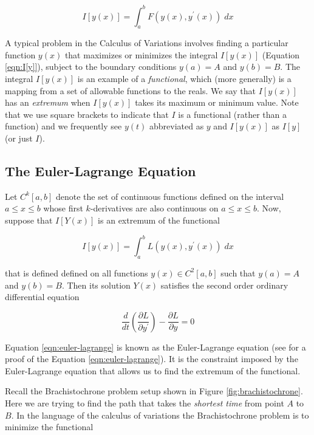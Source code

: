 \documentclass{article}
\theoremstyle{definition}
\begin{document}
\begin{equation}
I[y(x)] = \int_a^b F(y(x), y^{\prime}(x)) \; dx
\label{eqn:I[y]}
\end{equation}

\bigskip
\noindent
A typical problem in the Calculus of Variations involves finding
a particular function $y(x)$ that maximizes or minimizes the
integral $I[y(x)]$ (Equation \ref{eqn:I[y]}), subject to the
boundary conditions $y(a) = A$ and $y(b) = B$. The integral
$I[y(x)]$ is an example of a \emph{functional}, which (more
generally) is a mapping from a set of allowable functions to the
reals. We say that $I[y(x)]$ has an \emph{extremum} when
$I[y(x)]$ takes its maximum or minimum value. Note that we use
square brackets to indicate that $I$ is a functional (rather than
a function) and we frequently see $y(t)$ abbreviated as $y$ and
$I[y(x)]$ as $I[y]$ (or just $I$).

\subsection{The Euler-Lagrange Equation}
\label{subsec:euler-lagrange}
Let $C^k [a,b]$ denote the set of continuous functions defined on
the interval $a \leq x \leq b$ whose first $k$-derivatives are
also continuous on $a \leq x \leq b$. Now, suppose that $I[Y(x)]$
is an extremum of the functional

\medskip
\begin{equation*}
I[y(x)] = \int_a^b L(y(x), y^{\prime}(x)) \; dx
\end{equation*}

\bigskip
\noindent
that is defined defined on all functions $y(x) \in C^2 [a,b]$
such that $y(a) = A$ and $y(b) = B$.  Then its solution $Y(x)$
satisfies the second order ordinary differential equation


\bigskip
\begin{equation}
\dfrac{d}{dt} \left ( \dfrac{\partial L}{\partial y^{\prime}}
\right ) -  \dfrac{\partial L}{\partial y} = 0 
\label{eqn:euler-lagrange}
\end{equation}

\bigskip
\noindent
Equation \ref{eqn:euler-lagrange} is known as the Euler-Lagrange
equation (see \cite{notes:pola} for a proof of the Equation
\ref{eqn:euler-lagrange}). It is the constraint imposed by the
Euler-Lagrange equation that allows us to find the extremum of
the functional.



\bigskip
\noindent
Recall the Brachistochrone problem setup shown in Figure
\ref{fig:brachistochrone}.  Here we are trying to find the path
that takes the \emph{shortest time} from point $A$ to $B$. In the
language of the calculus of variations \cite{wiki:cov} the
Brachistochrone problem is to minimize the functional
\end{document}
